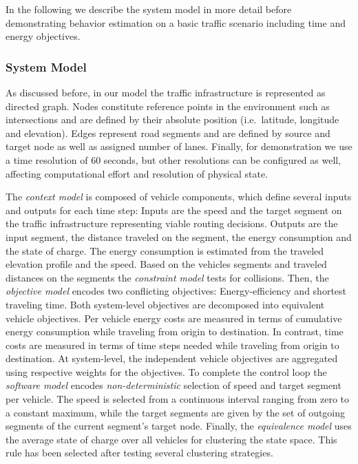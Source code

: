 \documentclass[conference]{../cls/IEEEtran}
\begin{document}
In the following we describe the system model in more detail before demonstrating behavior estimation on a basic traffic scenario including time and energy objectives.

\subsubsection*{System Model}

As discussed before, in our model the traffic infrastructure is represented as
directed graph. Nodes constitute reference points in the environment such as
intersections and are defined by their absolute position (i.e.\ latitude,
longitude and elevation). Edges represent road segments and are defined by
source and target node as well as assigned number of lanes. Finally, for
demonstration we use a time resolution of 60 seconds, but other resolutions can
be configured as well, affecting computational effort and resolution of
physical state.

The \textit{context model} is composed of vehicle components, which define
several inputs and outputs for each time step: Inputs are the speed and the
target segment on the traffic infrastructure representing viable routing
decisions. Outputs are the input segment, the distance traveled on
the segment, the energy consumption and the state of charge. The energy
consumption is estimated from the traveled elevation profile and the speed.
Based on the vehicles segments and traveled distances on the segments the
\textit{constraint model} tests for collisions. Then, the \textit{objective
model} encodes two conflicting objectives: Energy-efficiency and shortest
traveling time. Both system-level objectives are decomposed into equivalent
vehicle objectives. Per vehicle energy costs are measured in terms of cumulative
energy consumption while traveling from origin to destination. In contrast, time
costs are measured in terms of time steps needed while traveling from origin to
destination. At system-level, the independent vehicle objectives are aggregated
using respective weights for the objectives. To complete the control loop the
\textit{software model} encodes \textit{non-deterministic} selection of speed and target segment per vehicle.
The speed is selected from a continuous interval ranging from zero to a constant
maximum, while the target segments are given by the set of outgoing
segments of the current segment's target node. Finally, the \textit{equivalence
model} uses the average state of charge over all vehicles for clustering the
state space. This rule has been selected after testing several clustering strategies.
\end{document}
